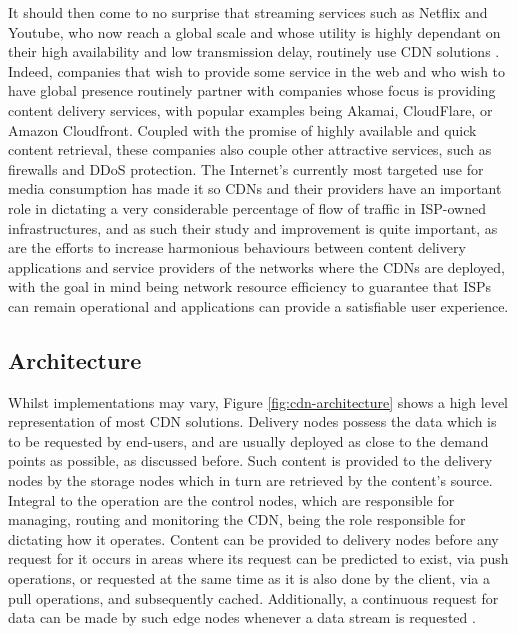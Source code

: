     It should then come to no surprise that streaming services such as Netflix and Youtube, who now reach a global scale and whose utility is highly dependant on their high availability and low transmission delay, routinely use CDN solutions \cite{cookbook}.
    Indeed, companies that wish to provide some service in the web and who wish to have global presence routinely partner with companies whose focus is providing content delivery services, with popular examples being Akamai, CloudFlare, or Amazon Cloudfront.
    Coupled with the promise of highly available and quick content retrieval, these companies also couple other attractive services, such as firewalls and DDoS protection.
    The Internet's currently most targeted use for media consumption has made it so CDNs and their providers have an important role in dictating a very considerable percentage of flow of traffic in ISP-owned infrastructures, and as such their study and improvement is quite important, as are the efforts to increase harmonious behaviours between content delivery applications and service providers of the networks where the CDNs are deployed, with the goal in mind being network resource efficiency to guarantee that ISPs can remain operational and applications can provide a satisfiable user experience.

\subsection{Architecture}

    Whilst implementations may vary, Figure \ref{fig:cdn-architecture} shows a high level representation of most CDN solutions.
    Delivery nodes possess the data which is to be requested by end-users, and are usually deployed as close to the demand points as possible, as discussed before.
    Such content is provided to the delivery nodes by the storage nodes which in turn are retrieved by the content's source.
    Integral to the operation are the control nodes, which are responsible for managing, routing and monitoring the CDN, being the role responsible for dictating how it operates.
    Content can be provided to delivery nodes before any request for it occurs in areas where its request can be predicted to exist, via push operations, or requested at the same time as it is also done by the client, via a pull operations, and subsequently cached.
    Additionally, a continuous request for data can be made by such edge nodes whenever a data stream is requested \cite{cdn-guide}.

